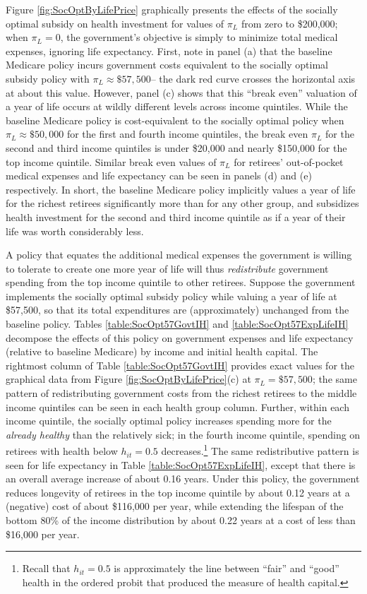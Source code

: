 \documentclass[12pt,pdftex,letterpaper]{article}
\newcommand{\Health}{h}
\begin{document}
Figure \ref{fig:SocOptByLifePrice} graphically presents the effects of the socially optimal subsidy on health investment for values of $\pi_L$ from zero to \$200,000; when $\pi_L=0$, the government's objective is simply to minimize total medical expenses, ignoring life expectancy.  First, note in panel (a) that the baseline Medicare policy incurs government costs equivalent to the socially optimal subsidy policy with $\pi_L \approx \$57,500$-- the dark red curve crosses the horizontal axis at about this value.  However, panel (c) shows that this ``break even'' valuation of a year of life occurs at wildly different levels across income quintiles.  While the baseline Medicare policy is cost-equivalent to the socially optimal policy when $\pi_L \approx \$50,000$ for the first and fourth income quintiles, the break even $\pi_L$ for the second and third income quintiles is under \$20,000 and nearly \$150,000 for the top income quintile.  Similar break even values of $\pi_L$ for retirees' out-of-pocket medical expenses and life expectancy can be seen in panels (d) and (e) respectively.  In short, the baseline Medicare policy implicitly values a year of life for the richest retirees significantly more than for any other group, and subsidizes health investment for the second and third income quintile as if a year of their life was worth considerably less.

A policy that equates the additional medical expenses the government is willing to tolerate to create one more year of life will thus \textit{redistribute} government spending from the top income quintile to other retirees.  Suppose the government implements the socially optimal subsidy policy while valuing a year of life at \$57,500, so that its total expenditures are (approximately) unchanged from the baseline policy.  Tables \ref{table:SocOpt57GovtIH} and \ref{table:SocOpt57ExpLifeIH} decompose the effects of this policy on government expenses and life expectancy (relative to baseline Medicare) by income and initial health capital.  The rightmost column of Table \ref{table:SocOpt57GovtIH} provides exact values for the graphical data from Figure \ref{fig:SocOptByLifePrice}(c) at $\pi_L = \$57,500$; the same pattern of redistributing government costs from the richest retirees to the middle income quintiles can be seen in each health group column.  Further, within each income quintile, the socially optimal policy increases spending more for the \textit{already healthy} than the relatively sick; in the fourth income quintile, spending on retirees with health below $\Health_{it} = 0.5$ decreases.\footnote{Recall that $\Health_{it} = 0.5$ is approximately the line between ``fair'' and ``good'' health in the ordered probit that produced the measure of health capital.}  The same redistributive pattern is seen for life expectancy in Table \ref{table:SocOpt57ExpLifeIH}, except that there is an overall average increase of about 0.16 years.  Under this policy, the government reduces longevity of retirees in the top income quintile by about 0.12 years at a (negative) cost of about \$116,000 per year, while extending the lifespan of the bottom 80\% of the income distribution by about 0.22 years at a cost of less than \$16,000 per year.
\end{document}
